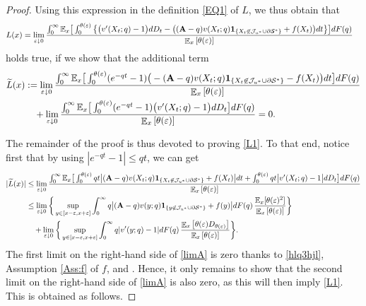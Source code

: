 \documentclass[11pt]{article} %
\newcommand{\tild}{\widetilde}
\DeclareMathOperator{\E}{\mathbb E}
\numberwithin{komcounter}{section}
\renewcommand{\epsilon}{\varepsilon}
\begin{document}
\begin{proof}
Using this expression in the definition \eqref{EQ1} of $L$, we thus obtain that 
\begin{align*}
L(x) &= \lim_{\epsilon \downarrow 0} \frac{\int_0^\infty \mathbb{E}_x\big[ \int_0^{\theta(\epsilon)} \big\{ \big(v'(X_{t};q) - 1 \big) dD_t - \big((\textbf{A}-q) v(X_t;q) {\bf 1}_{\{X_t\not\in \mathcal{J}_{u^*} \cup \partial\mathcal{S}^*\}} + f(X_t) \big) dt \big\} \big] dF(q) }{\E_{x}\left[\theta(\epsilon)\right]} 
\end{align*}
holds true, if we show that the additional term 
\begin{align} \label{L1}
\begin{split} 
\tild L(x) &:= 
\lim_{\epsilon \downarrow 0} \frac{\int_0^\infty \mathbb{E}_x\big[ \int_0^{\theta(\epsilon)} (e^{-qt} - 1) \big(-(\textbf{A}-q) v(X_t;q) {\bf 1}_{\{X_t\not\in \mathcal{J}_{u^*} \cup \partial\mathcal{S}^*\}} - f(X_t) \big) dt \big] dF(q)}{\E_{x}\left[\theta(\epsilon)\right]}\\ 
&\quad + \lim_{\epsilon \downarrow 0} \frac{\int_0^\infty \mathbb{E}_x\big[ \int_0^{\theta(\epsilon)} (e^{-qt} - 1) \big(v'(X_{t};q) - 1 \big) dD_t \big] dF(q)}{\E_{x}\left[\theta(\epsilon)\right]}
= 0.
\end{split}
\end{align}

The remainder of the proof is thus devoted to proving \eqref{L1}. 
To that end, notice first that by using $|e^{-qt}-1| \leq qt$, we can get
\begin{align} \label{limA}
|\tild L(x)| 
&\leq \lim_{\epsilon \downarrow 0} \frac{\int_0^\infty \mathbb{E}_x\big[ \int_0^{\theta(\epsilon)} q t \big|(\textbf{A}-q) v(X_t;q) {\bf 1}_{\{X_t\not\in \mathcal{J}_{u^*} \cup \partial\mathcal{S}^*\}} + f(X_t) \big| dt + \int_0^{\theta(\epsilon)} q t \big| v'(X_{t};q) - 1 \big| dD_t \big] dF(q) }{\E_{x}\left[\theta(\epsilon)\right]}
\notag\\
&\leq \lim_{\epsilon \downarrow 0} \bigg\{ \sup_{y\in[x-\epsilon,x+\epsilon]} \int_0^\infty q \big|(\textbf{A}-q) v(y;q) {\bf 1}_{\{y\not\in \mathcal{J}_{u^*} \cup \partial\mathcal{S}^*\}} + f(y) \big| dF(q) \, \frac{\mathbb{E}_x [\theta(\epsilon)^2]}{\E_{x}\left[\theta(\epsilon)\right]}\bigg\} \notag\\
&\quad + \lim_{\epsilon \downarrow 0} \bigg\{ \sup_{y\in[x-\epsilon,x+\epsilon]} \int_0^\infty q |v'(y;q)-1| dF(q) \, \frac{\E_x\left[ \theta(\epsilon) D_{\theta(\epsilon)} \right]}{\E_x\left[\theta(\epsilon)\right]} \bigg\}.
\end{align}
The first limit on the right-hand side of \eqref{limA} is zero thanks to \eqref{hlq3hjl}, Assumption \ref{Ass:f} of $f$, and \cite[Lemma A.5]{christensen2020time}. 
Hence, it only remains to show that the second limit on the right-hand side of \eqref{limA} is also zero, as this will then imply \eqref{L1}. This is obtained as follows. 


\end{proof}
\end{document}
